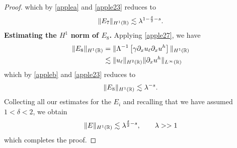 \begin{proof}
which by  \cref{applea} and \eqref{apple23} reduces to
\begin{equation}
	\begin{split}
		\|E_7\|_{H^1(\mathbb{R})} \lesssim \lambda^{1-\frac{\delta}{2}-s}.
		\label{apple33'}
	\end{split}
\end{equation}
%
%
%
%
%
{\bf Estimating the $H^1$ norm of $\hyperref[all_errors_together]{E_8}$.} Applying \eqref{apple27}, we have
\begin{equation}
	\begin{split}
		\|E_8\|_{H^1(\mathbb{R})}
		& = \|\Lambda^{-1}\left[ \gamma \partial_x u_\ell \partial_x u^h \right]\|_{H^1(\mathbb{R})}
		\\
		& \lesssim \|u_\ell\|_{H^2(\mathbb{R})} \|\partial_x u^h\|_{L^\infty(\mathbb{R})}
		\label{apple33}
	\end{split}
\end{equation}
which by  \cref{appleb} and \eqref{apple23} reduces to
\begin{equation}
	\begin{split}
		\|E_8\|_{H^1(\mathbb{R})} \lesssim \lambda^{-s}.
		\label{apple34}
	\end{split}
\end{equation}
Collecting all our estimates for the $E_i$ and recalling that we have assumed
$1<\delta<2$, we obtain
\begin{equation*}
	\begin{split}
		\|E\|_{H^1(\mathbb{R})}
		 \lesssim \lambda^{\frac{\delta}{2} -s }, \qquad \lambda >>1
	\end{split}
\end{equation*}
which completes the proof.
\end{proof}
%
%
%
%
%
